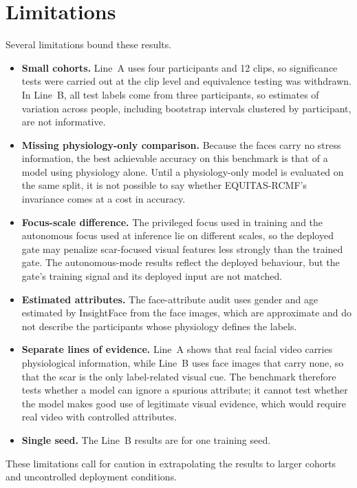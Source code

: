 \section{Limitations}
\label{sec:limitations}
Several limitations bound these results.
\begin{itemize}
    \item \textbf{Small cohorts.} Line~A uses four participants and 12 clips, so significance tests were carried out at the clip level and equivalence testing was withdrawn. In Line~B, all test labels come from three participants, so estimates of variation across people, including bootstrap intervals clustered by participant, are not informative.
    \item \textbf{Missing physiology-only comparison.} Because the faces carry no stress information, the best achievable accuracy on this benchmark is that of a model using physiology alone. Until a physiology-only model is evaluated on the same split, it is not possible to say whether EQUITAS-RCMF's invariance comes at a cost in accuracy.
    \item \textbf{Focus-scale difference.} The privileged focus used in training and the autonomous focus used at inference lie on different scales, so the deployed gate may penalize scar-focused visual features less strongly than the trained gate. The autonomous-mode results reflect the deployed behaviour, but the gate's training signal and its deployed input are not matched.
    \item \textbf{Estimated attributes.} The face-attribute audit uses gender and age estimated by InsightFace from the face images, which are approximate and do not describe the participants whose physiology defines the labels.
    \item \textbf{Separate lines of evidence.} Line~A shows that real facial video carries physiological information, while Line~B uses face images that carry none, so that the scar is the only label-related visual cue. The benchmark therefore tests whether a model can ignore a spurious attribute; it cannot test whether the model makes good use of legitimate visual evidence, which would require real video with controlled attributes.
    \item \textbf{Single seed.} The Line~B results are for one training seed.
\end{itemize}
These limitations call for caution in extrapolating the results to larger cohorts and uncontrolled deployment conditions.
